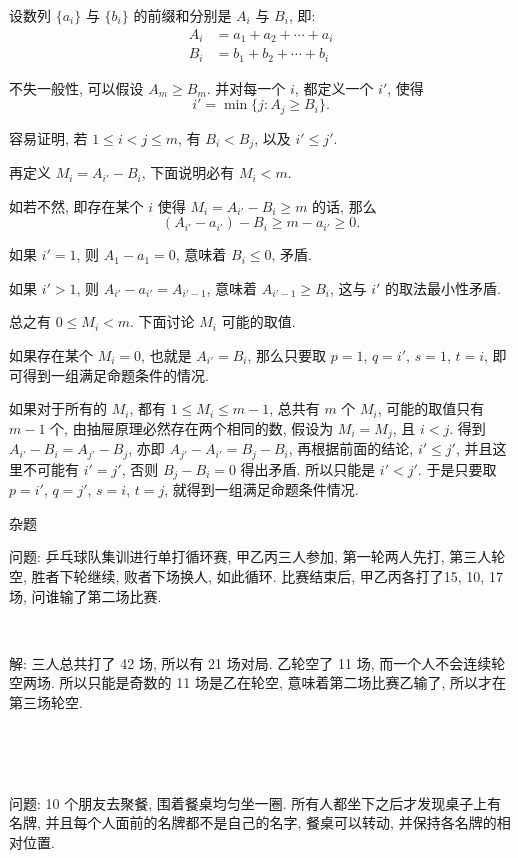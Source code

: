 设数列 $\{a_i\}$ 与 $\{b_i\}$ 的前缀和分别是 $A_i$ 与 $B_i$, 即:
\begin{align*}
A_i &= a_1+a_2+\cdots+a_i \\
B_i &= b_1+b_2+\cdots+b_i 
\end{align*}

不失一般性, 可以假设 $A_m \ge B_m$. 并对每一个 $i$, 都定义一个 $i'$, 使得 
$$i'=\min\{j: A_j\ge B_i\} .$$

容易证明, 若 $1\le i < j \le m$, 有 $B_i<B_j$, 以及 $i ' \le j '$.

再定义 $M_i=A_{i'}-B_i$, 下面说明必有 $M_i < m$. 

如若不然, 即存在某个 $i$ 使得 $M_i = A_{i'}-B_i \ge m$ 的话, 那么 
$$(A_{i '} - a_{i '})-B_i \ge m - a_{i '} \ge 0 .$$

如果 $i' = 1$, 则 $A_1 - a_1 = 0$, 意味着 $B_i \le 0$, 矛盾.

如果 $i' > 1$, 则 $A_{i '} - a_{i '} = A_{i ' - 1}$,  意味着 $A_{i ' - 1} \ge B_i$, 这与 $i'$ 的取法最小性矛盾.

总之有 $0\le M_i < m$. 下面讨论 $M_i$ 可能的取值.

如果存在某个 $M_i = 0$, 也就是 $A_{i'} = B_i$, 那么只要取 $p=1$, $q=i'$, $s=1$, $t=i$, 即可得到一组满足命题条件的情况.

如果对于所有的 $M_i$, 都有 $1 \le M_i \le m-1$, 总共有 $m$ 个 $M_i$, 可能的取值只有 $m-1$ 个, 由抽屉原理必然存在两个相同的数, 假设为 $M_i = M_j$, 且 $i < j$. 得到 $A_{i '} - B_i = A_{j '} - B_j$, 亦即 $A_{j '} - A_{i '} = B_j - B_i$, 再根据前面的结论, $i '\le j '$, 并且这里不可能有 $i '=j '$, 否则 $B_j-B_i=0$ 得出矛盾. 所以只能是 $i' < j '$. 于是只要取 $p=i'$, $q=j'$, $s=i$, $t=j$, 就得到一组满足命题条件情况.

\newpage
\noindent 杂题

问题: 乒乓球队集训进行单打循环赛, 甲乙丙三人参加, 第一轮两人先打, 第三人轮空, 胜者下轮继续, 败者下场换人, 如此循环. 比赛结束后, 甲乙丙各打了15, 10, 17场, 问谁输了第二场比赛.

~

解: 三人总共打了 42 场, 所以有 21 场对局. 乙轮空了 11 场, 而一个人不会连续轮空两场. 所以只能是奇数的 11 场是乙在轮空, 意味着第二场比赛乙输了, 所以才在第三场轮空.

~

~

问题: 10 个朋友去聚餐, 围着餐桌均匀坐一圈. 所有人都坐下之后才发现桌子上有名牌, 并且每个人面前的名牌都不是自己的名字, 餐桌可以转动, 并保持各名牌的相对位置. 

